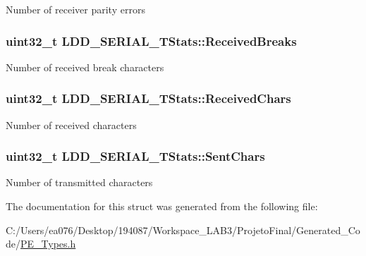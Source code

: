 Number of receiver parity errors \hypertarget{struct_l_d_d___s_e_r_i_a_l___t_stats_a45f707461666b974a6c3b5c948e66cf7}{
\subsubsection[{Received\-Breaks}]{\setlength{\rightskip}{0pt plus 5cm}uint32\-\_\-t L\-D\-D\-\_\-\-S\-E\-R\-I\-A\-L\-\_\-\-T\-Stats\-::\-Received\-Breaks}}\label{struct_l_d_d___s_e_r_i_a_l___t_stats_a45f707461666b974a6c3b5c948e66cf7}
Number of received break characters \hypertarget{struct_l_d_d___s_e_r_i_a_l___t_stats_a7dd5faa8bc6c15fde011eb6192ca6168}{
\subsubsection[{Received\-Chars}]{\setlength{\rightskip}{0pt plus 5cm}uint32\-\_\-t L\-D\-D\-\_\-\-S\-E\-R\-I\-A\-L\-\_\-\-T\-Stats\-::\-Received\-Chars}}\label{struct_l_d_d___s_e_r_i_a_l___t_stats_a7dd5faa8bc6c15fde011eb6192ca6168}
Number of received characters \hypertarget{struct_l_d_d___s_e_r_i_a_l___t_stats_a60198f844b85f9e73efaca83e32471cd}{
\subsubsection[{Sent\-Chars}]{\setlength{\rightskip}{0pt plus 5cm}uint32\-\_\-t L\-D\-D\-\_\-\-S\-E\-R\-I\-A\-L\-\_\-\-T\-Stats\-::\-Sent\-Chars}}\label{struct_l_d_d___s_e_r_i_a_l___t_stats_a60198f844b85f9e73efaca83e32471cd}
Number of transmitted characters 

The documentation for this struct was generated from the following file\-:\begin{DoxyCompactItemize}
\item 
C\-:/\-Users/ea076/\-Desktop/194087/\-Workspace\-\_\-\-L\-A\-B3/\-Projeto\-Final/\-Generated\-\_\-\-Code/\hyperlink{_p_e___types_8h}{P\-E\-\_\-\-Types.\-h}\end{DoxyCompactItemize}
